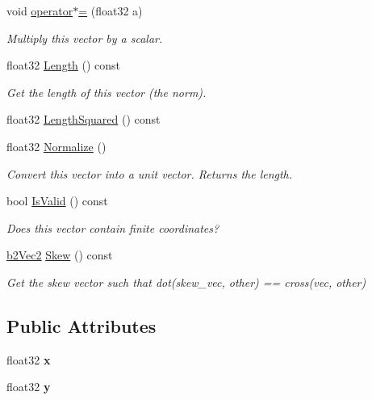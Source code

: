 \begin{DoxyCompactItemize}
void \mbox{\hyperlink{structb2Vec2_a7097696dce578322928f4535b34f1c6b}{operator$\ast$=}} (float32 a)
\begin{DoxyCompactList}\small\item\em Multiply this vector by a scalar. \end{DoxyCompactList}\item 
\mbox{\label{structb2Vec2_a04cb9ac9e845a59f4212b2d7149fa3d9}} 
float32 \mbox{\hyperlink{structb2Vec2_a04cb9ac9e845a59f4212b2d7149fa3d9}{Length}} () const
\begin{DoxyCompactList}\small\item\em Get the length of this vector (the norm). \end{DoxyCompactList}\item 
float32 \mbox{\hyperlink{structb2Vec2_af8a081dac7eea7800fdbfbf95ac9e395}{Length\+Squared}} () const
\item 
\mbox{\label{structb2Vec2_adda78c92f318fe53d8a53f9b5cfd8e41}} 
float32 \mbox{\hyperlink{structb2Vec2_adda78c92f318fe53d8a53f9b5cfd8e41}{Normalize}} ()
\begin{DoxyCompactList}\small\item\em Convert this vector into a unit vector. Returns the length. \end{DoxyCompactList}\item 
\mbox{\label{structb2Vec2_abad59bf9a0269f02cda9dc919592c0ee}} 
bool \mbox{\hyperlink{structb2Vec2_abad59bf9a0269f02cda9dc919592c0ee}{Is\+Valid}} () const
\begin{DoxyCompactList}\small\item\em Does this vector contain finite coordinates? \end{DoxyCompactList}\item 
\mbox{\label{structb2Vec2_aaf36e082a20368b24edb635511872a74}} 
\mbox{\hyperlink{structb2Vec2}{b2\+Vec2}} \mbox{\hyperlink{structb2Vec2_aaf36e082a20368b24edb635511872a74}{Skew}} () const
\begin{DoxyCompactList}\small\item\em Get the skew vector such that dot(skew\+\_\+vec, other) == cross(vec, other) \end{DoxyCompactList}\end{DoxyCompactItemize}
\subsection*{Public Attributes}
\begin{DoxyCompactItemize}
\item 
\mbox{\label{structb2Vec2_a07021c1c08c547868e3cce9c9ef2ea71}} 
float32 {\bfseries x}
\item 
\mbox{\label{structb2Vec2_a880f573a9efe402ec207e9d132cb2a43}} 
float32 {\bfseries y}
\end{DoxyCompactItemize}


